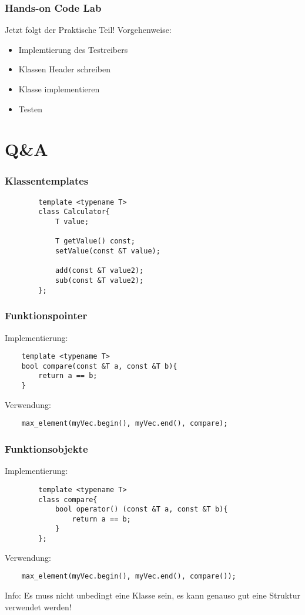 \documentclass{beamer}
\begin{document}
\begin{frame}[<+->][Label=codeLab]\frametitle{Hands-on Code Lab}
    \pause
    Jetzt folgt der Praktische Teil!
    Vorgehenweise:
    \pause
    \begin{itemize}
    	\item Implemtierung des Testreibers
    	\item Klassen Header schreiben
    	\item Klasse implementieren
    	\item Testen
    \end{itemize}
\end{frame}

\section{Q\&A}


\begin{frame}[fragile]\frametitle{Klassentemplates}
    
	\begin{lstlisting}
		template <typename T>
		class Calculator{
		    T value;

		    T getValue() const;
		    setValue(const &T value);

		    add(const &T value2);
		    sub(const &T value2);
		};
	\end{lstlisting}
\end{frame}

\begin{frame}[fragile]\frametitle{Funktionspointer}
    Implementierung:
    \begin{lstlisting}
	template <typename T>
	bool compare(const &T a, const &T b){
	    return a == b;
	}
    \end{lstlisting}
    \pause
    Verwendung:
    \begin{lstlisting}
	max_element(myVec.begin(), myVec.end(), compare); 
    \end{lstlisting}
\end{frame}

\begin{frame}[fragile]\frametitle{Funktionsobjekte}
    Implementierung:
    \begin{lstlisting}
		template <typename T>
		class compare{
		    bool operator() (const &T a, const &T b){
		        return a == b;
		    }
		};
    \end{lstlisting}
    \pause
    Verwendung:
    \begin{lstlisting}
	max_element(myVec.begin(), myVec.end(), compare()); 
    \end{lstlisting}
    \pause
    \begin{alertblock}{Info:}
        Es muss nicht unbedingt eine Klasse sein, es kann genauso gut eine Struktur verwendet werden! 
    \end{alertblock}
\end{frame}
\end{document}

